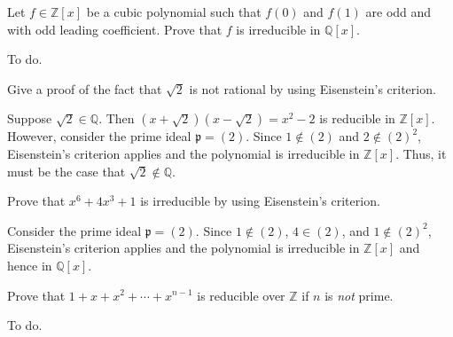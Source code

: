 \documentclass[../../master.tex]{subfiles}
\begin{document}
\begin{problem}
    Let $f \in \mathbb{Z}[x]$ be a cubic polynomial such that $f(0)$ and $f(1)$ are odd and with odd leading coefficient.
    Prove that $f$ is irreducible in $\mathbb{Q}[x]$.
\end{problem}

\begin{solution}
    To do.
\end{solution}

\begin{problem}
    Give a proof of the fact that $\sqrt{2}$ is not rational by using Eisenstein's criterion.
\end{problem}

\begin{solution}
    Suppose $\sqrt{2} \in \mathbb{Q}$. 
    Then $(x + \sqrt{2}) (x - \sqrt{2}) = x^2 - 2$ is reducible in $\mathbb{Z}[x]$.
    However, consider the prime ideal $\mathfrak{p} = (2)$.
    Since $1 \notin (2)$ and $2 \notin (2)^2$, Eisenstein's criterion applies and the polynomial is irreducible in $\mathbb{Z}[x]$.
    Thus, it must be the case that $\sqrt{2} \notin \mathbb{Q}$.
\end{solution}

\begin{problem}
    Prove that $x^{6} + 4x^3 + 1$ is irreducible by using Eisenstein's criterion.
\end{problem}

\begin{solution}
    Consider the prime ideal $\mathfrak{p} = (2)$.
    Since $1 \notin (2)$, $4 \in (2)$, and $1 \notin (2)^2$, Eisenstein's criterion applies and the polynomial is irreducible in $\mathbb{Z}[x]$ and hence in $\mathbb{Q}[x]$.
\end{solution}

\begin{problem}
    Prove that $1 + x + x^2 + \cdots + x^{n-1}$ is reducible over $\mathbb{Z}$ if $n$ is \textit{not} prime.
\end{problem}

\begin{solution}
    To do.
\end{solution}
\end{document}
